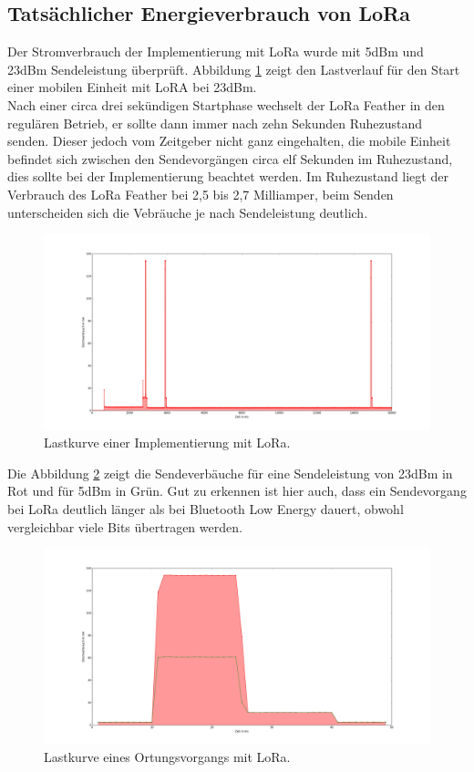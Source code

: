 \subsection{Tatsächlicher Energieverbrauch von LoRa}
\label{ch:phase3:sec:powerlora}
Der Stromverbrauch der Implementierung mit LoRa wurde mit 5dBm und 23dBm Sendeleistung überprüft.
Abbildung \ref{fig:lora23} zeigt den Lastverlauf für den Start einer mobilen Einheit mit LoRA bei 23dBm.\\
Nach einer circa drei sekündigen Startphase wechselt der LoRa Feather in den regulären Betrieb, er sollte dann immer nach zehn Sekunden Ruhezustand senden.
Dieser jedoch vom Zeitgeber nicht ganz eingehalten, die mobile Einheit befindet sich zwischen den Sendevorgängen circa elf Sekunden im Ruhezustand, dies sollte bei der Implementierung beachtet werden.
Im Ruhezustand liegt der Verbrauch des LoRa Feather bei 2,5 bis 2,7 Milliamper, beim Senden unterscheiden sich die Vebräuche je nach Sendeleistung deutlich.\\

\begin{figure}[h!]
  \centering
	\includegraphics[width=\textwidth]{plots/lora23.png}
  \caption{Lastkurve einer Implementierung mit LoRa.}
  \label{fig:lora23}
\end{figure}

Die Abbildung \ref{fig:lora235send} zeigt die Sendeverbäuche für eine Sendeleistung von 23dBm in Rot und für 5dBm in Grün.
Gut zu erkennen ist hier auch, dass ein Sendevorgang bei LoRa deutlich länger als bei Bluetooth Low Energy dauert, obwohl vergleichbar viele Bits übertragen werden.

\begin{figure}[h!]
  \centering
	\includegraphics[width=\textwidth]{plots/lora235send.png}
  \caption{Lastkurve eines Ortungsvorgangs mit LoRa.}
  \label{fig:lora235send}
\end{figure}

